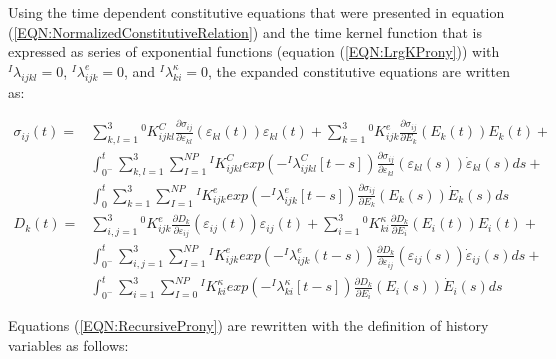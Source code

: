 Using the time dependent constitutive equations that were presented in equation (\ref{EQN:NormalizedConstitutiveRelation}) and the time kernel function that is expressed as series of exponential functions (equation (\ref{EQN:LrgKProny})) with $ {}^{I}\lambda_{ijkl}=0$, $ {}^{I}\lambda_{ijk}^{e}=0$, and $ {}^{I}\lambda_{ki}^{\kappa}=0$, 
the expanded constitutive equations are written as:


\begin{equation}
\begin{aligned} 
\sigma_{ij}(t)=
&\sum_{k,l=1}^{3} {}^{0}K_{ijkl}^{C} 
\frac{\partial \sigma_{ij}}{\partial \varepsilon_{kl}}(\varepsilon_{kl}(t)) \varepsilon_{kl}(t)+
\sum_{k=1}^{3}
{}^{0}K_{ijk}^{e}\frac{\partial \sigma_{ij}}{\partial E_{k}}(E_{k} (t)) E_{k} (t) +\\
&\int_{0^-}^t 
\sum_{k,l=1}^{3} 
\sum_{I=1}^{NP}{}^{I}K_{ijkl}^{C} exp(-{}^{I}\lambda_{ijkl}^{C}[t-s]) 
\frac{\partial \sigma_{ij}}{\partial
\varepsilon_{kl}}(\varepsilon_{kl}(s)) \dot{\varepsilon}_{kl}(s)ds +\\
&\int_{0}^t 
\sum_{k=1}^{3}
\sum_{I=1}^{NP}
{}^{I}K_{ijk}^{e}
exp(-{}^{I}\lambda_{ijk}^{e}[t-s]) \frac{\partial \sigma_{ij}}{\partial E_{k}} (E_{k} (s)) \dot{E}_{k} (s)ds
\\
D_k(t)=
&\sum_{i,j=1}^{3}
{}^{0}K_{ijk}^{e}\frac{\partial
D_{k}}{\partial \varepsilon_{ij}} (\varepsilon_{ij}(t)) \varepsilon_{ij}(t)+
\sum_{i=1}^{3}
{}^{0}K_{ki}^{\kappa}\frac{\partial D_{k}}{\partial E_{i}}(E_{i} (t)) E_{i} (t)+\\
&\int_{0^-}^t 
\sum_{i,j=1}^{3}  
\sum_{I=1}^{NP}
{}^{I}K_{ijk}^{e} exp(-{}^{I}\lambda_{ijk}^{e}(t-s))
\frac{\partial D_{k}}{\partial \varepsilon_{ij}}(\varepsilon_{ij}(s))\dot{\varepsilon}_{ij}(s)ds+\\
&\int_{0^-}^t 
\sum_{i=1}^{3} 
\sum_{I=0}^{NP}
{}^{I}K_{ki}^{\kappa}exp(-{}^{I}\lambda_{ki}^{\kappa}[t-s]) \frac{\partial D_{k}}{\partial E_{i}} (E_{i} (s)) \dot{E}_{i} (s)ds
\end{aligned}
\label{EQN:RecursiveProny}
\end{equation}

Equations (\ref{EQN:RecursiveProny}) are rewritten with the definition of history variables as follows:

